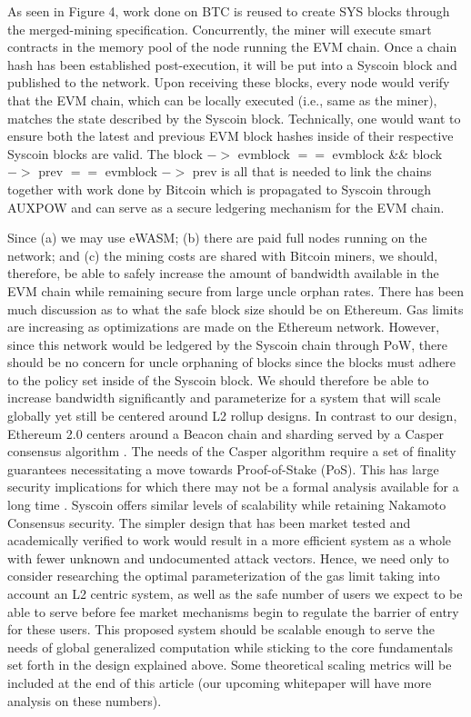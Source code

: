 \documentclass[peerreview]{ieeesyscoin}
\begin{document}
As seen in Figure 4, work done on BTC is reused to create SYS blocks through the merged-mining specification. Concurrently, the miner will execute smart contracts in the memory pool of the node running the EVM chain. Once a chain hash has been established post-execution, it will be put into a Syscoin block and published to the network. Upon receiving these blocks, every node would verify that the EVM chain, which can be locally executed (i.e., same as the miner), matches the state described by the Syscoin block. Technically, one would want to ensure both the latest and previous EVM block hashes inside of their respective Syscoin blocks are valid. The block $->$ evmblock $==$ evmblock \&\& block $->$ prev $==$ evmblock $->$ prev is all that is needed to link the chains together with work done by Bitcoin which is propagated to Syscoin through AUXPOW and can serve as a secure ledgering mechanism for the EVM chain.

Since (a) we may use eWASM; (b) there are paid full nodes running on the network; and (c) the mining costs are shared with Bitcoin miners, we should, therefore, be able to safely increase the amount of bandwidth available in the EVM chain while remaining secure from large uncle orphan rates. There has been much discussion as to what the safe block size should be on Ethereum. Gas limits are increasing as optimizations are made on the Ethereum network. However, since this network would be ledgered by the Syscoin chain through PoW, there should be no concern for uncle orphaning of blocks since the blocks must adhere to the policy set inside of the Syscoin block. We should therefore be able to increase bandwidth significantly and parameterize for a system that will scale globally yet still be centered around L2 rollup designs. In contrast to our design, Ethereum 2.0 centers around a Beacon chain and sharding served by a Casper consensus algorithm \cite{But17}. The needs of the Casper algorithm require a set of finality guarantees necessitating a move towards Proof-of-Stake (PoS). This has large security implications for which there may not be a formal analysis available for a long time \cite{Neu21}. Syscoin offers similar levels of scalability while retaining Nakamoto Consensus security. The simpler design that has been market tested and academically verified to work would result in a more efficient system as a whole with fewer unknown and undocumented attack vectors. Hence, we need only to consider researching the optimal parameterization of the gas limit taking into account an L2 centric system, as well as the safe number of users we expect to be able to serve before fee market mechanisms begin to regulate the barrier of entry for these users. This proposed system should be scalable enough to serve the needs of global generalized computation while sticking to the core fundamentals set forth in the design explained above.  Some theoretical scaling metrics will be included at the end of this article (our upcoming whitepaper will have more analysis on these numbers).
\end{document}
